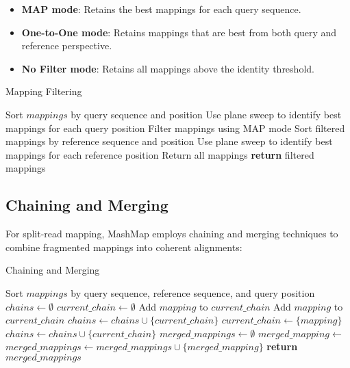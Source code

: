 \documentclass{article}
\begin{document}
\begin{itemize}
    \item \textbf{MAP mode}: Retains the best mappings for each query sequence.
    
    \item \textbf{One-to-One mode}: Retains mappings that are best from both query and reference perspective.
    
    \item \textbf{No Filter mode}: Retains all mappings above the identity threshold.
\end{itemize}

\begin{algorithm}
\caption{Mapping Filtering}
\begin{algorithmic}[1]
    \State Sort $mappings$ by query sequence and position
    \State Use plane sweep to identify best mappings for each query position
    \State Filter mappings using MAP mode
    \State Sort filtered mappings by reference sequence and position
    \State Use plane sweep to identify best mappings for each reference position
    \State Return all mappings
\EndIf
\State \textbf{return} filtered mappings
\EndProcedure
\end{algorithmic}
\end{algorithm}

\subsection{Chaining and Merging}

For split-read mapping, MashMap employs chaining and merging techniques to combine fragmented mappings into coherent alignments:

\begin{algorithm}
\caption{Chaining and Merging}
\begin{algorithmic}[1]
\State Sort $mappings$ by query sequence, reference sequence, and query position
\State $chains \gets \emptyset$
\State $current\_chain \gets \emptyset$
        \State Add $mapping$ to $current\_chain$
        \State Add $mapping$ to $current\_chain$
    \Else
        \State $chains \gets chains \cup \{current\_chain\}$
        \State $current\_chain \gets \{mapping\}$
    \EndIf
\EndFor
{}
    \State $chains \gets chains \cup \{current\_chain\}$
\EndIf
\State $merged\_mappings \gets \emptyset$
    \State $merged\_mapping \gets$ 
    \State $merged\_mappings \gets merged\_mappings \cup \{merged\_mapping\}$
\EndFor
\State \textbf{return} $merged\_mappings$
\EndProcedure
\end{algorithmic}
\end{algorithm}
\end{document}
